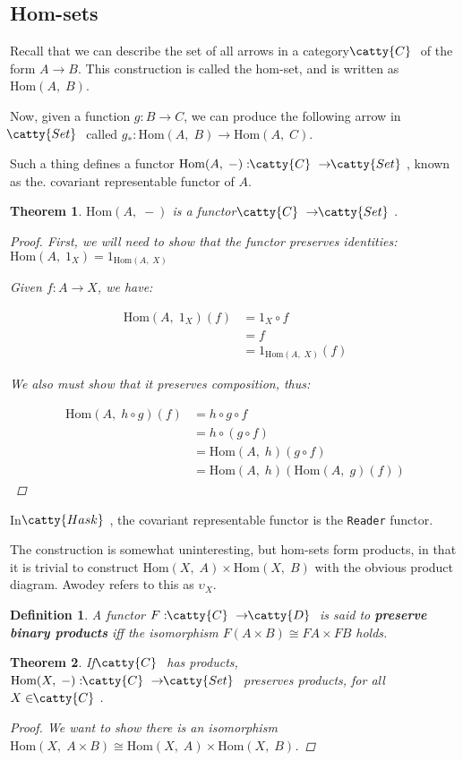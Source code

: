 \documentclass[]{article}
\newtheorem{theorem}{Theorem}
\newtheorem{definition}{Definition}
\renewcommand{\hom}[2]{\ensuremath{\text{Hom}(#1,\;#2)}}
\newcommand{\tfarr}[4][\to]{\ensuremath{#2 : #3 #1 #4}}
\newcommand{\functor}[3]{\ensuremath{#1 : \cat{#2} \to \cat{#3}}}
\newcommand{\cat}[1]{\ensuremath{\!\! \catty{#1} \,\,}}
\begin{document}
\subsection{Hom-sets}

Recall that we can describe the set of all arrows in a category \cat{C} of the
form $A\to B$. This construction is called the hom-set, and is written as
\hom{A}{B}.

Now, given a function \tfarr{g}{B}{C}, we can produce the following arrow in
\cat{Set} called \tfarr{g_*}{\hom{A}{B}}{\hom{A}{C}}.

Such a thing defines a functor \functor{\hom{A}{-}}{C}{Set}, known as the.
covariant representable functor of $A$.

\begin{theorem}
  \hom{A}{-} is a functor $\cat{C}\to\cat{Set}$.

  \begin{proof}
    First, we will need to show that the functor preserves identities:
    $\hom{A}{1_X} = 1_{\hom{A}{X}}$

    Given \tfarr{f}{A}{X}, we have:

    \begin{align*}
      \hom{A}{1_X}(f) &= 1_X \circ f \\ &= f \\ &= 1_{\hom{A}{X}}(f)
    \end{align*}

    We also must show that it preserves composition, thus:

    \begin{align*}
      \hom{A}{h \circ g}(f) &= h \circ g \circ f \\ & =h \circ (g \circ f) \\ &=
      \hom{A}{h}(g \circ f) \\ &= \hom{A}{h}(\hom{A}{g}(f))
    \end{align*}
  \end{proof}
\end{theorem}

In \cat{Hask}, the covariant representable functor is the \texttt{Reader}
functor.

The construction is somewhat uninteresting, but hom-sets form products, in that
it is trivial to construct $\hom{X}{A} \times \hom{X}{B}$ with the obvious
product diagram. Awodey refers to this as $\upsilon_X$.

\begin{definition}
  A functor \functor{F}{C}{D} is said to \textbf{preserve binary products} iff
  the isomorphism $F(A\times B) \cong FA \times FB$ holds.
\end{definition}

\begin{theorem}
  If \cat{C} has products, \functor{\hom{X}{-}}{C}{Set} preserves products, for
  all $X \in \cat{C}$.

  \begin{proof}
    We want to show there is an isomorphism $\hom{X}{A\times B}\cong
    \hom{X}{A} \times \hom{X}{B}$.

  \end{proof}
\end{theorem}
\end{document}

